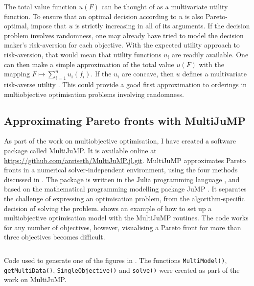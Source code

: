 \documentclass[main.tex]{subfiles}
\begin{document}
The total value function $u(F)$ can be thought of as a
multivariate utility function. To ensure that an optimal decision
according to $u$ is also Pareto-optimal, impose that $u$ is
strictly increasing in all of its arguments.
If the decision problem involves randomness, one may already have
tried to model the decision maker's risk-aversion for each objective.
With the expected utility approach to risk-aversion, that would mean
that utility functions $u_i$ are readily available. One can then make
a simple approximation of
the total value $u(F)$ with the mapping $F\mapsto \sum_{i=1}^n u_i(f_i)$.
If the $u_i$ are concave, then $u$ defines a multivariate risk-averse
utility \citep[Sec. 2.3.2]{campi2011multivariate}.
This could provide a good first approximation to orderings in
multiobjective optimisation problems involving randomness.


\subsection{Approximating Pareto fronts with
  MultiJuMP}\label{sec:one_multijump}
As part of the work on multiobjective optimisation, I have created a
software package called MultiJuMP.  It is available online at
\url{https://github.com/anriseth/MultiJuMP.jl.git}.  MultiJuMP
approximates Pareto fronts in a numerical solver-independent
environment, using the four methods discussed in
.  The package is written in the Julia
programming language \citep{bezanson2017julia}, and based on the
mathematical programming modelling package JuMP
\citep{dunning2017jump}. It separates the challenge of expressing an
optimisation problem, from the algorithm-specific decision of solving
the problem.  shows an example of how to set up a
multiobjective optimisation model with the MultiJuMP routines. The
code works for any number of objectives, however, visualising a Pareto
front for more than three objectives becomes difficult.
\begin{listing}[htbp]
  \inputminted{julia}{./include/multijump.jl}
  \caption{Code used to generate one of the figures in
    .
    The functions \texttt{MultiModel()},
    \texttt{getMultiData()},
    \texttt{SingleObjective()} and \texttt{solve()}
    were created as part of the work on MultiJuMP.
  }\label{lst:multijump}
\end{listing}




\biblio{} %
\end{document}
